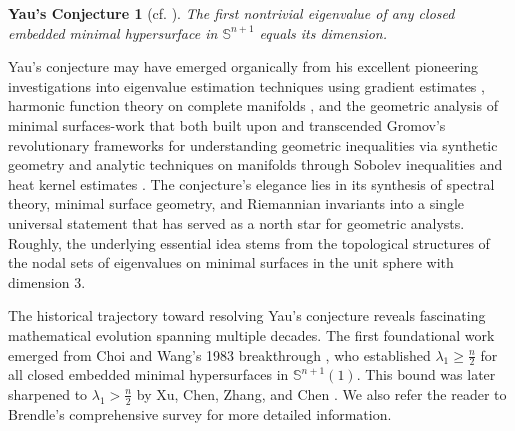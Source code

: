\documentclass[a4, 12pt]{amsart}
\numberwithin{equation}{section} \numberwithin{equation}{section}
\newtheorem*{Yau}{Yau's Conjecture}
\begin{document}
\begin{Yau}[cf. \cite{Yau3}]
The first nontrivial eigenvalue of any closed embedded minimal hypersurface in $\mathbb{S}^{n+1}$ equals its dimension.
\end{Yau}
Yau's conjecture may have emerged organically from his excellent pioneering investigations into eigenvalue estimation techniques using gradient estimates \cite{Yau1}, harmonic function theory on complete manifolds \cite{Yau2}, and the geometric analysis of minimal surfaces-work that both built upon and transcended Gromov's revolutionary frameworks for understanding geometric inequalities via synthetic geometry \cite{Gro} and   analytic techniques on manifolds through Sobolev inequalities and heat kernel estimates \cite{Li}. The conjecture's elegance lies in its synthesis of spectral theory, minimal surface geometry, and Riemannian invariants into a single universal statement that has served as a north star for geometric analysts. Roughly, the underlying essential idea stems from the topological structures of the nodal sets of eigenvalues on minimal surfaces in the unit sphere with dimension 3.

The historical trajectory toward resolving Yau's conjecture reveals fascinating mathematical evolution spanning multiple decades. The first foundational work emerged from Choi and Wang's 1983 breakthrough \cite{CW}, who established $\lambda_1 \geq \frac{n}{2}$ for all closed embedded minimal hypersurfaces in $\mathbb{S}^{n+1}(1)$. This bound was later sharpened to $\lambda_1 > \frac{n}{2}$ by Xu, Chen, Zhang, and Chen \cite{XCZC}. We also refer the reader to Brendle's comprehensive survey \cite{Br2} for more detailed information.
\end{document}
